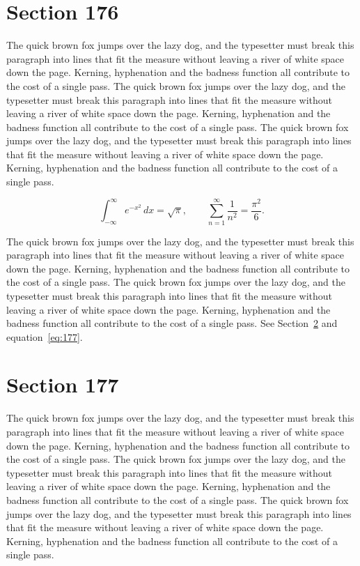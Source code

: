 \documentclass{article}
\begin{document}
\section{Section 176}
\label{sec:176}
The quick brown fox jumps over the lazy dog, and the typesetter must break this paragraph into lines that fit the measure without leaving a river of white space down the page. Kerning, hyphenation and the badness function all contribute to the cost of a single pass. The quick brown fox jumps over the lazy dog, and the typesetter must break this paragraph into lines that fit the measure without leaving a river of white space down the page. Kerning, hyphenation and the badness function all contribute to the cost of a single pass. The quick brown fox jumps over the lazy dog, and the typesetter must break this paragraph into lines that fit the measure without leaving a river of white space down the page. Kerning, hyphenation and the badness function all contribute to the cost of a single pass. 

\begin{equation}\label{eq:176}
\int_{-\infty}^{\infty} e^{-x^{2}}\,dx = \sqrt{\pi}, \qquad
\sum_{n=1}^{\infty} \frac{1}{n^{2}} = \frac{\pi^{2}}{6}.
\end{equation}

The quick brown fox jumps over the lazy dog, and the typesetter must break this paragraph into lines that fit the measure without leaving a river of white space down the page. Kerning, hyphenation and the badness function all contribute to the cost of a single pass. The quick brown fox jumps over the lazy dog, and the typesetter must break this paragraph into lines that fit the measure without leaving a river of white space down the page. Kerning, hyphenation and the badness function all contribute to the cost of a single pass. 
See Section~\ref{sec:177} and equation~\eqref{eq:177}.
\section{Section 177}
\label{sec:177}
The quick brown fox jumps over the lazy dog, and the typesetter must break this paragraph into lines that fit the measure without leaving a river of white space down the page. Kerning, hyphenation and the badness function all contribute to the cost of a single pass. The quick brown fox jumps over the lazy dog, and the typesetter must break this paragraph into lines that fit the measure without leaving a river of white space down the page. Kerning, hyphenation and the badness function all contribute to the cost of a single pass. The quick brown fox jumps over the lazy dog, and the typesetter must break this paragraph into lines that fit the measure without leaving a river of white space down the page. Kerning, hyphenation and the badness function all contribute to the cost of a single pass. 
\end{document}
